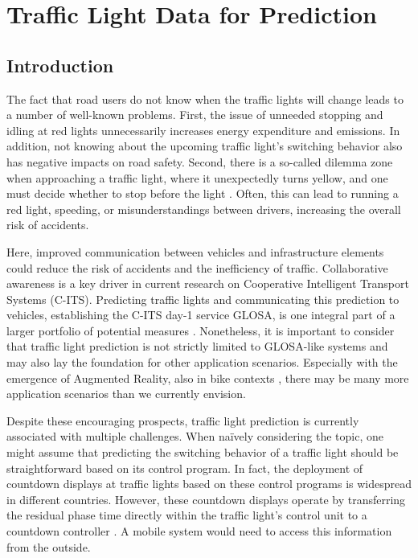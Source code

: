 \chapter{Traffic Light Data for Prediction}\label{ch:prediction}


\section{Introduction}

The fact that road users do not know when the traffic lights will change leads to a number of well-known problems. First, the issue of unneeded stopping and idling at red lights unnecessarily increases energy expenditure and emissions. In addition, not knowing about the upcoming traffic light's switching behavior also has negative impacts on road safety. Second, there is a so-called dilemma zone when approaching a traffic light, where it unexpectedly turns yellow, and one must decide whether to stop before the light \cite{zhang_yellow_2014, suzuki_new_2018}. Often, this can lead to running a red light, speeding, or misunderstandings between drivers, increasing the overall risk of accidents.

Here, improved communication between vehicles and infrastructure elements could reduce the risk of accidents and the inefficiency of traffic. Collaborative awareness is a key driver in current research on Cooperative Intelligent Transport Systems (C-ITS). Predicting traffic lights and communicating this prediction to vehicles, establishing the C-ITS day-1 service GLOSA, is one integral part of a larger portfolio of potential measures \cite{mellegard_day_2020}. Nonetheless, it is important to consider that traffic light prediction is not strictly limited to GLOSA-like systems and may also lay the foundation for other application scenarios. Especially with the emergence of Augmented Reality, also in bike contexts \cite{matviienko_bikear_2022, kosch_notibike_2022}, there may be many more application scenarios than we currently envision.

Despite these encouraging prospects, traffic light prediction is currently associated with multiple challenges. When naïvely considering the topic, one might assume that predicting the switching behavior of a traffic light should be straightforward based on its control program. In fact, the deployment of countdown displays at traffic lights based on these control programs is widespread in different countries. However, these countdown displays operate by transferring the residual phase time directly within the traffic light's control unit to a countdown controller \cite{islam_improved_2016}. A mobile system would need to access this information from the outside.

